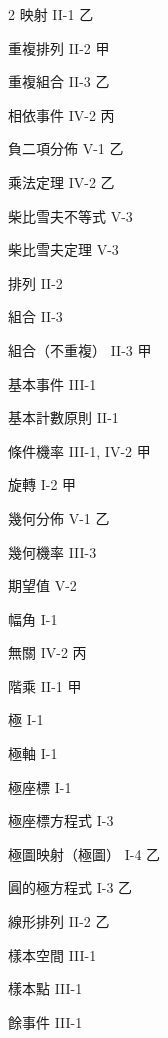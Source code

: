 \begin{multicols}{2}
\noindent 映射 \dotfill II-1 乙\par
\noindent 重複排列 \dotfill II-2 甲\par
\noindent 重複組合 \dotfill II-3 乙\par
\noindent 相依事件 \dotfill IV-2 丙\par
\noindent 負二項分佈 \dotfill V-1 乙

\noindent 乘法定理 \dotfill IV-2 乙\par
\noindent 柴比雪夫不等式 \dotfill V-3\par
\noindent 柴比雪夫定理 \dotfill V-3

\noindent 排列 \dotfill II-2\par
\noindent 組合 \dotfill II-3\par
\noindent 組合（不重複） \dotfill II-3 甲\par
\noindent 基本事件 \dotfill III-1\par
\noindent 基本計數原則 \dotfill II-1\par
\noindent 條件機率 \dotfill III-1, IV-2 甲\par
\noindent 旋轉 \dotfill I-2 甲

\noindent 幾何分佈 \dotfill V-1 乙\par
\noindent 幾何機率 \dotfill III-3\par
\noindent 期望值 \dotfill V-2\par
\noindent 幅角 \dotfill I-1\par
\noindent 無關 \dotfill IV-2 丙\par
\noindent 階乘 \dotfill II-1 甲

\noindent 極 \dotfill I-1\par
\noindent 極軸 \dotfill I-1\par
\noindent 極座標 \dotfill I-1\par
\noindent 極座標方程式 \dotfill I-3\par
\noindent 極圖映射（極圖） \dotfill I-4 乙\par
\noindent 圓的極方程式 \dotfill I-3 乙

\noindent 線形排列 \dotfill II-2 乙\par
\noindent 樣本空間 \dotfill III-1\par
\noindent 樣本點 \dotfill III-1\par
\noindent 餘事件 \dotfill III-1


\end{multicols}
